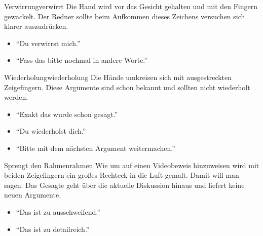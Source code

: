 \begin{handzeichen}{Verwirrung}{verwirrt}
Die Hand wird vor das Gesicht gehalten und mit den Fingern gewackelt. Der Redner sollte beim Aufkommen dieses Zeichens versuchen sich klarer auszudrücken.
\begin{itemize}
	\item \enquote{Du verwirrst mich.}
	\item \enquote{Fass das bitte nochmal in andere Worte.}
\end{itemize}
\end{handzeichen}

\begin{handzeichen}{Wiederholung}{wiederholung}
Die Hände umkreisen sich mit ausgestreckten Zeigefingern. 
Diese Argumente sind schon bekannt und sollten nicht wiederholt werden.
\begin{itemize}
	\item \enquote{Exakt das wurde schon gesagt.}
	\item \enquote{Du wiederholst dich.}
	\item \enquote{Bitte mit dem nächsten Argument weitermachen.}
\end{itemize}
\end{handzeichen}

\begin{handzeichen}{Sprengt den Rahmen}{rahmen}
	Wie um auf einen Videobeweis hinzuweisen wird mit beiden Zeigefingern ein großes Rechteck in die Luft gemalt. Damit will man sagen: Das Gesagte geht über die aktuelle Diskussion hinaus und liefert keine neuen Argumente.
	\begin{itemize}
		\item \enquote{Das ist zu ausschweifend.}
		\item \enquote{Das ist zu detailreich.}
	\end{itemize}
\end{handzeichen}
